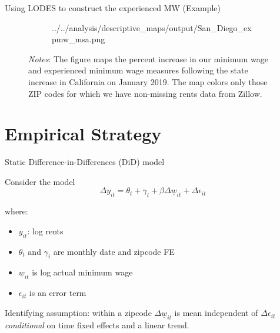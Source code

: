 \documentclass[ignorenonframetext,aspectratio=169]{beamer}
\providecommand{\tightlist}{%
  \setlength{\itemsep}{0pt}\setlength{\parskip}{0pt}}
\begin{document}
\begin{frame}{Using LODES to construct the experienced MW (Example)}
\begin{figure}
\begin{subfigure}[b]{0.65\textwidth}
            {../../analysis/descriptive_maps/output/San_Diego_expmw_msa.png}
    \end{subfigure}
    \begin{minipage}{0.95\textwidth} \footnotesize
        \vspace{2mm} 
        \textit{Notes}: The figure maps the percent increase in our minimum wage and 
        experienced minimum wage measures following the state increase in California
        on January 2019. The map colors only those ZIP codes for which we have 
        non-missing rents data from Zillow.
    \end{minipage}
\end{figure}

\end{frame}

\hypertarget{empirical-strategy}{%
\section{Empirical Strategy}\label{empirical-strategy}}

\begin{frame}{Static Difference-in-Differences (DiD) model}
\protect\hypertarget{static-difference-in-differences-did-model}{}

Consider the model \begin{equation}\label{eq:did}
        \Delta y_{it} = \theta_t + \gamma_i + \beta \Delta \underline{w}_{it} + \Delta \epsilon_{it}
\end{equation}

where:

\begin{itemize}
\tightlist
\item
  \(y_{it}\): log rents
\item
  \(\theta_t\) and \(\gamma_i\) are monthly date and zipcode FE
\item
  \(\underline{w}_{it}\) is log actual minimum wage
\item
  \(\epsilon_{it}\) is an error term
\end{itemize}

Identifying assumption: within a zipcode \(\Delta \underline{w}_{it}\)
is mean independent of \(\Delta \epsilon_{it}\) \emph{conditional} on
time fixed effects and a linear trend.

\end{frame}
\end{document}
